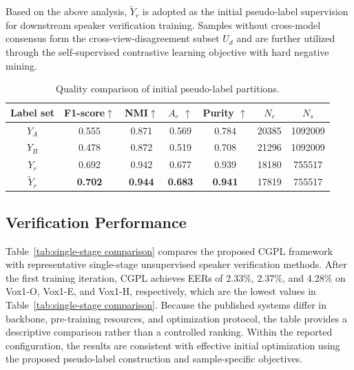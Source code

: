 \documentclass[journal]{IEEEtran}
\begin{document}
Based on the above analysis, $\tilde{Y}_r$ is adopted as the initial pseudo-label supervision for downstream speaker verification training. Samples without cross-model consensus form the cross-view-disagreement subset $U_d$ and are further utilized through the self-supervised contrastive learning objective with hard negative mining.
\begin{table}[!t]
    \centering
    \caption{Quality comparison of initial pseudo-label partitions.}
    \setlength{\tabcolsep}{4pt}
    \begin{tabular}{c c c c c c c}
        \hline
        Label set & F1-score$\uparrow$ & NMI$\uparrow$ &
        $A_c$ $\uparrow$ & 
        Purity $\uparrow$ & 
        $N_c$& 
        $N_s$ \\
        \hline
        $Y_A$ 
        & 0.555 
        & 0.871 
        & 0.569 
        & 0.784 
        & 20385 
        & 1092009 \\

        $Y_B$ 
        & 0.478
        & 0.872 
        & 0.519 
        & 0.708 
        & 21296 
        & 1092009 \\

        $Y_r$ 
        & 0.692 
        & 0.942 
        & 0.677 
        & 0.939
        & 18180 
        & 755517 \\

        $\tilde{Y}_r$
        & \textbf{0.702}
        & \textbf{0.944}
        & \textbf{0.683}
        & \textbf{0.941}
        & 17819
        & 755517 \\
        \hline
    \end{tabular}
    \label{tab:first_round_metrics}
\end{table}


\subsection{Verification Performance}

Table~\ref{tab:single-stage comparison} compares the proposed CGPL
framework with representative single-stage unsupervised speaker
verification methods.
After the first training iteration, CGPL achieves EERs of 2.33\%,
2.37\%, and 4.28\% on Vox1-O, Vox1-E, and Vox1-H, respectively,
which are the lowest values in Table~\ref{tab:single-stage comparison}.
Because the published systems differ in backbone, pre-training resources,
and optimization protocol, the table provides a descriptive comparison
rather than a controlled ranking. Within the reported configuration, the
results are consistent with effective initial optimization using the
proposed pseudo-label construction and sample-specific objectives.
\end{document}
